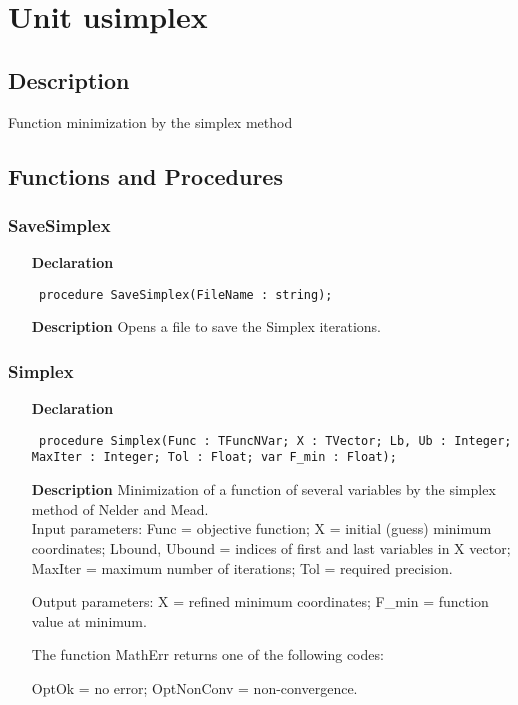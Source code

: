 \documentclass[12pt,a4paper,oneside]{report}
\newcommand{\declarationitem}[1]{\textbf{#1}}
\newcommand{\descriptiontitle}[1]{\textbf{#1}}
\newcommand{\code}[1]{\texttt{#1}}
\begin{document}
\section{Unit usimplex}
\label{usimplex}
\subsection{Description}
Function minimization by the simplex method 
\subsection{Functions and Procedures}
\subsubsection{SaveSimplex}
\label{usimplex-SaveSimplex}
\begin{itemize}\item[\declarationitem{Declaration}\hfill]
	\begin{flushleft}
		\code{
			procedure SaveSimplex(FileName : string);}
		
	\end{flushleft}
	
	\par
	\item[\descriptiontitle{Description}]
	Opens a file to save the Simplex iterations.
	
\end{itemize}
\subsubsection{Simplex}
\label{usimplex-Simplex}
\begin{itemize}\item[\declarationitem{Declaration}\hfill]
	\begin{flushleft}
		\code{
			procedure Simplex(Func : TFuncNVar; X : TVector; Lb, Ub : Integer; MaxIter : Integer; Tol : Float; var F{\_}min : Float);}
		
	\end{flushleft}
	
	\par
	\item[\descriptiontitle{Description}]
	Minimization of a function of several variables by the simplex method of Nelder and Mead. \\
	Input parameters: Func = objective function; X = initial (guess) minimum coordinates; Lbound, Ubound = indices of first and last variables in X vector; MaxIter = maximum number of iterations; Tol = required precision.
	
	Output parameters: X = refined minimum coordinates; F{\_}min = function value at minimum.
	
	The function MathErr returns one of the following codes:
	
	OptOk = no error; OptNonConv = non{-}convergence.
	
\end{itemize}
\end{document}
